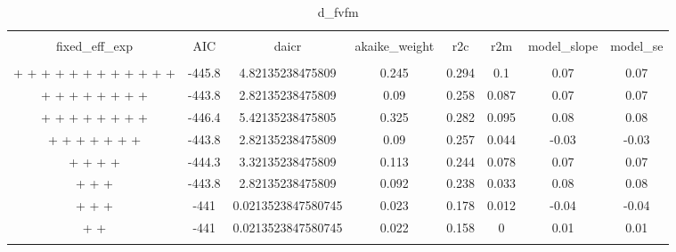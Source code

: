 
\begin{table}[!htbp] \centering 
  \caption{d_fvfm} 
  \label{d_fvfm} 
\begin{tabular}{@{\extracolsep{5pt}} cccccccc} 
\\[-1.8ex]\hline 
\hline \\[-1.8ex] 
fixed\_eff\_exp & AIC & daicr & akaike\_weight & r2c & r2m & model\_slope & model\_se \\ 
\hline \\[-1.8ex] 
 +  +  +  +  +  +  +  +  +  +  +  +  & -445.8 & 4.82135238475809 & 0.245 & 0.294 & 0.1 & 0.07 & 0.07 \\ 
 +  +  +  +  +  +  +  +  & -443.8 & 2.82135238475809 & 0.09 & 0.258 & 0.087 & 0.07 & 0.07 \\ 
 +  +  +  +  +  +  +  +  & -446.4 & 5.42135238475805 & 0.325 & 0.282 & 0.095 & 0.08 & 0.08 \\ 
 +  +  +  +  +  +  +  & -443.8 & 2.82135238475809 & 0.09 & 0.257 & 0.044 & -0.03 & -0.03 \\ 
 +  +  +  +  & -444.3 & 3.32135238475809 & 0.113 & 0.244 & 0.078 & 0.07 & 0.07 \\ 
 +  +  +  & -443.8 & 2.82135238475809 & 0.092 & 0.238 & 0.033 & 0.08 & 0.08 \\ 
 +  +  +  & -441 & 0.0213523847580745 & 0.023 & 0.178 & 0.012 & -0.04 & -0.04 \\ 
 +  +  & -441 & 0.0213523847580745 & 0.022 & 0.158 & 0 & 0.01 & 0.01 \\ 
\hline \\[-1.8ex] 
\end{tabular} 
\end{table} 

